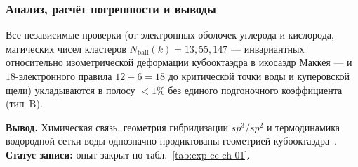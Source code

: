 \subsubsection*{Анализ, расчёт погрешности и выводы}
Все независимые проверки (от электронных оболочек углерода и кислорода, магических чисел кластеров $N_{\mathrm{ball}}(k) = 13, 55, 147$ --- инвариантных относительно изометрической деформации кубооктаэдра в икосаэдр Маккея --- и $18$-электронного правила $12+6=18$ до критической точки воды и куперовской щели) укладываются в полосу $<1\%$ без единого подгоночного коэффициента (тип~B).

\textbf{Вывод.}
Химическая связь, геометрия гибридизации $sp^3/sp^2$ и термодинамика водородной сетки воды однозначно продиктованы геометрией кубооктаэдра~\latGCKshort.
\textbf{Статус записи:} опыт закрыт по табл.~\ref{tab:exp-ce-ch-01}.
